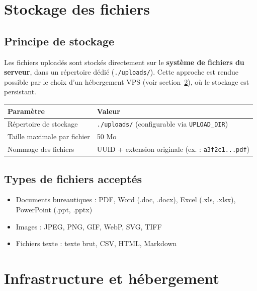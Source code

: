 \documentclass[a4paper,12pt,french]{article}
\begin{document}

\section{Stockage des fichiers}

\subsection{Principe de stockage}

Les fichiers uploadés sont stockés directement sur le \textbf{système de fichiers du serveur}, dans un répertoire dédié (\texttt{./uploads/}). Cette approche est rendue possible par le choix d'un hébergement VPS (voir section~\ref{sec:infra}), où le stockage est persistant.

\begin{tabularx}{\textwidth}{l X}
\toprule
\textbf{Paramètre} & \textbf{Valeur} \\
\midrule
Répertoire de stockage & \texttt{./uploads/} (configurable via \texttt{UPLOAD\_DIR}) \\
Taille maximale par fichier & 50 Mo \\
Nommage des fichiers & UUID + extension originale (ex. : \texttt{a3f2c1...pdf}) \\
\bottomrule
\end{tabularx}

\subsection{Types de fichiers acceptés}

\begin{itemize}
  \item Documents bureautiques : PDF, Word (.doc, .docx), Excel (.xls, .xlsx), PowerPoint (.ppt, .pptx)
  \item Images : JPEG, PNG, GIF, WebP, SVG, TIFF
  \item Fichiers texte : texte brut, CSV, HTML, Markdown
\end{itemize}


\section{Infrastructure et hébergement}
\label{sec:infra}
\end{document}
